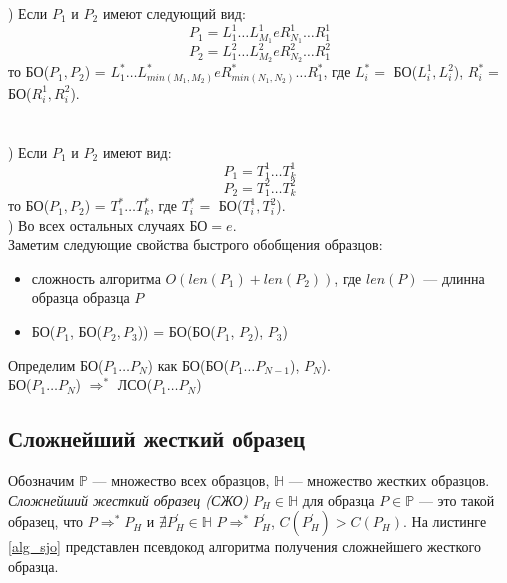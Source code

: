 \documentclass[12pt]{article}
\begin{document}
) Если $P_1$ и $P_2$ имеют следующий вид:
\begin{equation*}
P_1 = L_1^1 \ldots L_{M_1}^1 e R_{N_1}^1 \ldots R_1^1 
\end{equation*}
\begin{equation*}
P_2 = L_1^2 \ldots L_{M_2}^2 e R_{N_2}^2 \ldots R_1^2
\end{equation*}
\indent то БО($P_1, P_2$) = $L_1^* \ldots L_{min(M_1,M_2)}^* e R_{min(N_1,N_2)}^* \ldots R_1^*$, где $L_i^* = $ БО($L_i^1,L_i^2$), $R_i^* = $ БО($R_i^1,R_i^2$). \\
\\
\\
) Если $P_1$ и $P_2$ имеют вид:
\begin{equation*}
P_1 = T_1^1 \ldots T_k^1 
\end{equation*}
\begin{equation*}
P_2 = T_1^2 \ldots T_k^2
\end{equation*}
\indent то БО($P_1, P_2$) = $T_1^* \ldots T_k^*$, где $T_i^* = $ БО($T_i^1,T_i^2$).\\
) Во всех остальных случаях БО$ = e$.\\
\indent Заметим следующие свойства быстрого обобщения образцов:
\begin{itemize}
\item сложность алгоритма $O(len(P_1)+len(P_2))$, где $len(P)$ --- длинна образца образца $P$
\item БО($P_1$, БО($P_2, P_3$)) = БО(БО($P_1$, $P_2$), $P_3$)
\end{itemize}

\indent Определим БО($P_1 \ldots P_N$) как БО(БО($P_1 \ldots P_{N-1}$), $P_N$). \\
\indent БО($P_1 \ldots P_N$) $\Rightarrow^*$ ЛСО($P_1 \ldots P_N$)

\subsection[Сложнейший жесткий образец]{\large Сложнейший жесткий образец} \label{sec:sjo}
\hspace{\parindent} Обозначим $\mathbb{P}$ --- множество всех образцов, $\mathbb{H}$ --- множество жестких образцов. \textit{Сложнейший жесткий образец (СЖО)} $P_H \in \mathbb{H}$ для образца $P \in \mathbb{P}$ --- это такой образец, что $P \Rightarrow^* P_H$ и $\nexists P_H^{'} \in \mathbb{H}$ $ P \Rightarrow^* P_H^{'}$, $C(P_H^{'}) > C(P_H)$. На листинге \ref{alg_sjo} представлен псевдокод алгоритма получения сложнейшего жесткого образца.
\end{document}
